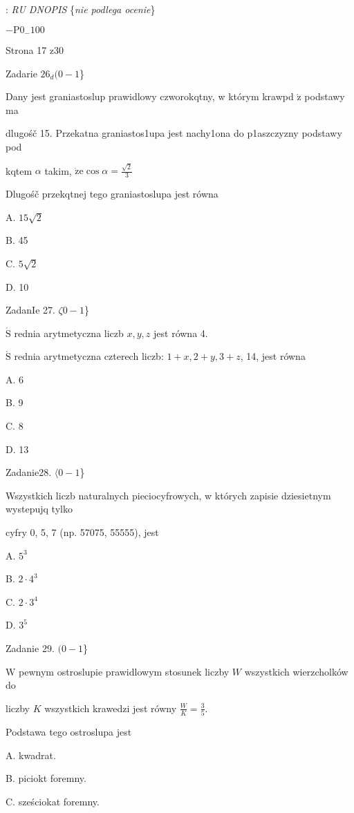 \documentclass[a4paper,12pt]{article}
\begin{document}
: {\it RU DNOPIS} \{{\it nie podlega ocenie}\}

$-\mathrm{P}0_{-}100$

Strona 17 z30





Zadarie $26_{d}(0-1$\}

Dany jest graniastoslup prawidlowy czworokqtny, w którym krawpd $\acute{\mathrm{z}}$ podstawy ma

dlugośč 15. Przekatna graniastos1upa jest nachy1ona do p1aszczyzny podstawy pod

kqtem $\alpha$ takim, $\dot{\mathrm{z}}\mathrm{e} \displaystyle \cos\alpha=\frac{\sqrt{2}}{3}$

Dlugośč przekqtnej tego graniastoslupa jest równa

A. $15\sqrt{2}$

B. 45

C. $5\sqrt{2}$

D. 10

ZadanIe 27. $\zeta 0-1$\}

$\acute{\mathrm{S}}$ rednia arytmetyczna liczb $x, y, z$ jest równa 4.

$\acute{\mathrm{S}}$ rednia arytmetyczna czterech liczb: $1+x, 2+y, 3+z$, 14, jest równa

A. 6

B. 9

C. 8

D. 13

Zadanie28. $\langle 0-1$\}

Wszystkich liczb naturalnych pieciocyfrowych, w których zapisie dziesietnym wystepujq tylko

cyfry 0, 5, 7 (np. 57075, 55555), jest

A. $5^{3}$

B. $2\cdot 4^{3}$

C. $2\cdot 3^{4}$

D. $3^{5}$

Zadanie 29. $(0-1$\}

$\mathrm{W}$ pewnym ostroslupie prawidlowym stosunek liczby $W$ wszystkich wierzcholków do

liczby $K$ wszystkich krawedzi jest równy $\displaystyle \frac{W}{K}=\frac{3}{5}.$

Podstawa tego ostroslupa jest

A. kwadrat.

B. piciokt foremny.

C. sześciokat foremny.
\end{document}
